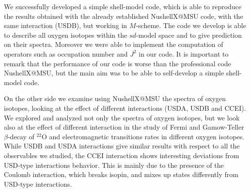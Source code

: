 We successfully developed a simple shell-model code, which is able to reproduce the results obtained with the already established NushellX@MSU code,  with the same interaction (USDB), but working in $M$-scheme.
The code we develop is able to describe all oxygen isotopes within the $sd$-model space and to give prediction on their spectra. Moreover we were able to implement the computation of operators such as occupation number and $J^2$ in our code.
It is important to remark that the performance of our code is worse than the professional code NushellX@MSU, but the main aim was to be able to self-develop a simple shell-model code.

On the other side we examine using NushellX@MSU the spectra of oxygen isotopes, looking at the effect of different interactions (USDA, USDB and CCEI).
We explored and analyzed not only the spectra of oxygen isotopes, but we look also at the effect of different interaction in the study of Fermi and Gamow-Teller $\beta$-decay of $^{22}$O and electromagnetic transitions rates in different oxygen isotopes.
While USDB and USDA interactions give similar results with respect to all the observables we studied, the CCEI interaction shows interesting deviations from USD-type interactions behavior.
This is mainly due to the presence of the Coulomb interaction, which breaks isopin, and mixes up states differently from USD-type interactions.
